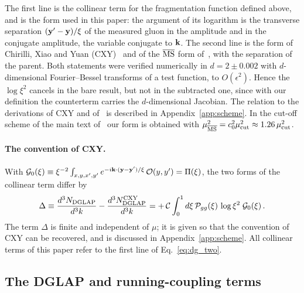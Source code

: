 The first line is the collinear term for the fragmentation function defined above, and is the form used in this paper: the argument of its logarithm is the transverse separation $(\mathbf{y}'-\mathbf{y})/\xi$ of the measured gluon in the amplitude and in the conjugate amplitude, the variable conjugate to $\mathbf{k}$. The second line is the form of Chirilli, Xiao and Yuan (CXY)~\cite{Chirilli:2011km,Chirilli:2012jd} and of the $\overline{\rm MS}$ form of~\cite{Altinoluk:2014eka}, with the separation of the parent. Both statements were verified numerically in $d=2\pm0.002$ with $d$-dimensional Fourier--Bessel transforms of a test function, to $O(\epsilon^2)$. Hence the $\log\xi^2$ cancels in the bare result, but not in the subtracted one, since with our definition the counterterm carries the $d$-dimensional Jacobian. The relation to the derivations of CXY and of~\cite{Altinoluk:2014eka} is described in Appendix~\ref{app:scheme}. In the cut-off scheme of the main text of~\cite{Altinoluk:2014eka} our form is obtained with $\mu^2_{\overline{\rm MS}}=c_0^2\mu^2_{\rm cut}\approx1.26\,\mu^2_{\rm cut}$.

\paragraph{The convention of CXY.} With $\mathcal G_0(\xi)\equiv\xi^{-2}\int_{x,y,x',y'}e^{-i\mathbf{k}\cdot(\mathbf{y}-\mathbf{y}')/\xi}\,\mathcal O(y,y')=\Pi(\xi)$, the two forms of the collinear term differ by
\begin{align}\label{eq:dg_Delta}
\Delta\equiv\frac{d^3N_{\rm DGLAP}}{d^3k}-\frac{d^3N^{\rm CXY}_{\rm DGLAP}}{d^3k}=+\,\mathcal C\int_0^1d\xi\,\mathcal P_{gg}(\xi)\,\log\xi^2\;\mathcal G_0(\xi)\,.
\end{align}
The term $\Delta$ is finite and independent of $\mu$; it is given so that the convention of CXY can be recovered, and is discussed in Appendix~\ref{app:scheme}. All collinear terms of this paper refer to the first line of Eq.~\eqref{eq:dg_two}.

\subsection{The DGLAP and running-coupling terms}\label{sec:dg_final}

